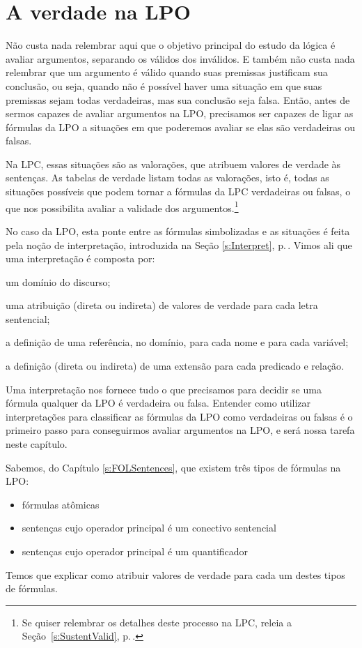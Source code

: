 \chapter{A verdade na LPO}\label{s:TruthFOL}
Não custa nada relembrar aqui que o objetivo principal do estudo da lógica é avaliar argumentos, separando os válidos dos inválidos.
E também não custa nada relembrar que um argumento é válido quando suas premissas justificam sua conclusão, ou seja, quando não é possível haver uma situação em que suas premissas sejam todas verdadeiras, mas sua conclusão seja falsa.
Então, antes de sermos capazes de avaliar argumentos na LPO, precisamos ser capazes de ligar as fórmulas da LPO a situações em que poderemos avaliar se elas são verdadeiras ou falsas.

Na LPC, essas situações são as valorações, que atribuem valores de verdade às sentenças.
As tabelas de verdade listam todas as valorações, isto é, todas as situações possíveis que podem tornar a fórmulas da LPC verdadeiras ou falsas, o que nos possibilita avaliar a validade dos argumentos.\footnote{
	Se quiser relembrar os detalhes deste processo na LPC, releia a Seção~\ref{s:SustentValid}, p.\,\pageref{s:SustentValid}.}

No caso da LPO, esta ponte entre as fórmulas simbolizadas e as situações é feita pela noção de interpretação, introduzida na Seção \ref{s:Interpret}, p.\,\pageref{s:Interpret}.
Vimos ali que uma interpretação é composta por: 
\begin{ebullet}
	\item um domínio do discurso;
	\item uma atribuição (direta ou indireta) de valores de verdade para cada letra sentencial;
	\item a definição de uma referência, no domínio, para cada nome e para cada variável;
	\item a definição (direta ou indireta) de uma extensão para cada predicado e relação.
\end{ebullet}
Uma interpretação nos fornece tudo o que precisamos para decidir se uma fórmula qualquer da LPO é verdadeira ou falsa.
Entender como utilizar interpretações para classificar as fórmulas da LPO como verdadeiras ou falsas é o primeiro passo para conseguirmos avaliar argumentos na LPO, e será nossa tarefa neste capítulo.

Sabemos, do Capítulo \ref{s:FOLSentences}, que existem três tipos de fórmulas na LPO:
	\begin{itemize}
		\item fórmulas atômicas
		\item sentenças cujo operador principal é um conectivo sentencial
		\item sentenças cujo operador principal é um quantificador
	\end{itemize}
Temos que explicar como atribuir valores de verdade para cada um destes tipos de fórmulas.

